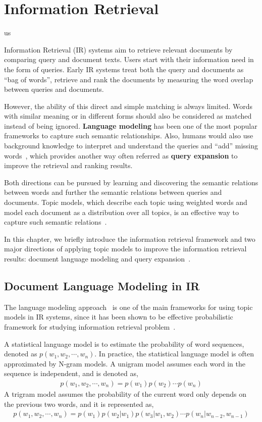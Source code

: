 \chapter{Information Retrieval}
\label{ch:ir}

us

Information Retrieval (IR) systems aim to retrieve relevant documents by comparing query and document texts. Users start with their information need in the form of queries. Early IR systems treat both the query and documents as ``bag of words'', retrieve and rank the documents by measuring the word overlap between queries and documents. 

However, the ability of this direct and simple matching is always limited. Words with similar meaning or in different forms should also be considered as matched instead of being ignored. \textbf{Language modeling} has been one of the most popular frameworks to capture such semantic relationships. Also, humans would also use background knowledge to interpret and understand the queries and ``add'' missing words~\citep{wei-07}, which provides another way often referred as \textbf{query expansion} to improve the retrieval and ranking results.

Both directions can be pursued by learning and discovering the semantic relations between words and further the semantic relations between queries and documents. Topic models, which describe each topic using weighted words and model each document as a distribution over all topics, is an effective way to capture such semantic relations~\citep{deerwester-90,hofmann-99a}.

In this chapter, we briefly introduce the information retrieval framework and two major directions of applying topic models to improve the information retrieval results: document language modeling \citep{Lu-2011,wei-06} and query expansion~\citep{Park-2009,Andrzejewski-2011}.

\section{Document Language Modeling in IR}

The language modeling approach~\citep{croft-03,PonteCroft,song-99} is one of the main frameworks for using topic models in IR systems, since it has been shown to be effective probabilistic framework for studying information retrieval problem~\citep{PonteCroft,berger-99}.

A statistical language model is to estimate the probability of word sequences, denoted as $p(w_1,w_2,\cdots,w_n)$. In practice, the statistical language model is often approximated by N-gram models. A unigram model assumes each word in the sequence is independent, and is denoted as,
\begin{align}
p(w_1,w_2,\cdots,w_n) = p(w_1)p(w_2) \cdots p(w_n)
\end{align}
A trigram model assumes the probability of the current word only depends on the previous two words, and it is represented as,
\begin{align}
p(w_1,w_2,\cdots,w_n)=p(w_1)p(w_2|w_1)p(w_3|w_1,w_2)\cdots p(w_n|w_{n-2},w_{n-1})
\end{align}

